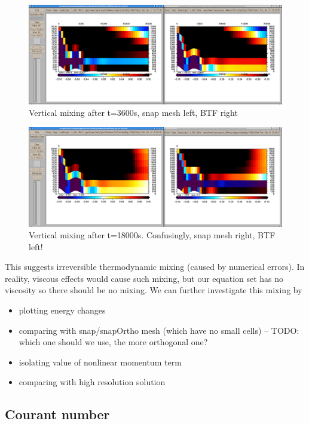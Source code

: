 \begin{figure}
\includegraphics[width=\textwidth]{interim-results/gravityWavesBTFsnapMidZoom3600.png}
\caption{Vertical mixing after t=3600s, snap mesh left, BTF right}
\label{fig:gw:mixing-3600s}
\end{figure}

\begin{figure}
\includegraphics[width=\textwidth]{interim-results/gravityWavesBTFsnapMidZoom18000.png}
\caption{Vertical mixing after t=18000s.  Confusingly, snap mesh right, BTF left!}
\label{fig:gw:mixing-18000s}
\end{figure}

This suggests irreversible thermodynamic mixing (caused by numerical errors).  In reality, viscous effects would cause such mixing, but our equation set has no viscosity so there should be no mixing.  We can further investigate this mixing by
\begin{itemize}
	\item plotting energy changes
	\item comparing with snap/snapOrtho mesh (which have no small cells) -- TODO: which one should we use, the more orthogonal one?
	\item isolating value of nonlinear momentum term
	\item comparing with high resolution solution
\end{itemize}

\subsection{Courant number}

